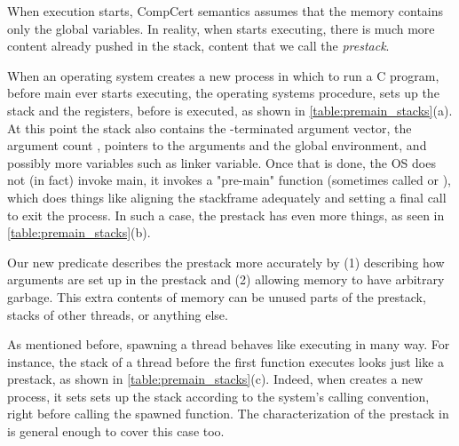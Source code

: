 When execution starts, CompCert semantics assumes that the memory contains only the global variables. In reality, when  starts executing, there is much more content already pushed in the stack, content that we call the \emph{prestack}. 

 When an operating system creates a new process in which to run a C program, before main ever starts executing, the operating systems  procedure, sets up the stack and the registers, before \main is executed, as shown in \ref{table:premain_stacks}(a). At this point the stack also contains the -terminated argument vector, the argument count , pointers to the arguments and the global environment, and possibly more variables such as linker variable. Once that is done, the OS does not (in fact) invoke main, it invokes a "pre-main" function  (sometimes called  or ), which does things like aligning the stackframe adequately and setting a final call to exit the process. In such a case, the prestack has even more things, as seen in \ref{table:premain_stacks}(b). 

Our new predicate  describes the prestack more accurately by (1) describing how arguments are set up in the prestack and (2) allowing memory to have arbitrary garbage. This extra contents of memory can be unused parts of the prestack, stacks of other threads, or anything else.   

%
%
%

As mentioned before, spawning a thread behaves like executing \main in many way. For instance, the stack of a thread before the first function executes looks just like a prestack, as shown in \ref{table:premain_stacks}(c). Indeed, when  creates a new process, it sets sets up the stack according to the system's calling convention, right before calling the spawned function. The characterization of the prestack in  is general enough to cover this case too.

